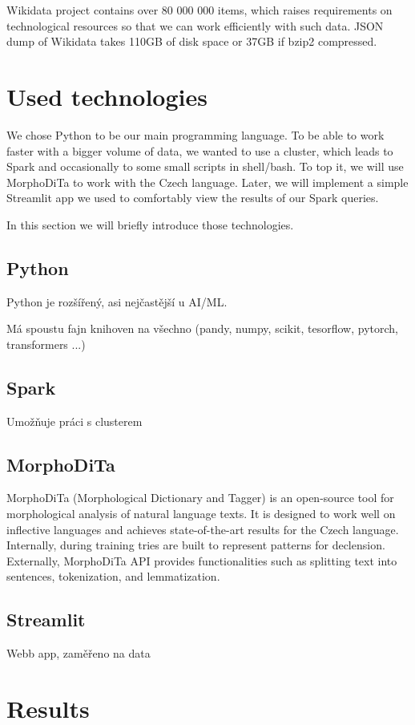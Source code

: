 Wikidata project contains over 80 000 000 items, which raises  requirements on technological resources so that we can work efficiently with such data. JSON dump of Wikidata takes 110GB of disk space or 37GB if bzip2 compressed.



\section{Used technologies}
We chose Python to be our main programming language. To be able to work faster with a bigger volume of data, we wanted to use a cluster, which leads to Spark and occasionally to some small scripts in shell/bash. To top it, we will use MorphoDiTa to work with the Czech language. Later, we will implement a simple Streamlit app we used to comfortably view the results of our Spark queries.

In this section we will briefly introduce those technologies.
\subsection{Python}
Python je rozšířený, asi nejčastější u AI/ML.

Má spoustu fajn knihoven na všechno (pandy, numpy, scikit, tesorflow, pytorch, transformers ...)

\subsection{Spark}
Umožňuje práci s clusterem

\subsection{MorphoDiTa}
MorphoDiTa \cite{Morphodita} (Morphological Dictionary and Tagger) is an open-source tool for morphological analysis of natural language texts. It is designed to work well on inflective languages and achieves state-of-the-art results for the Czech language. Internally, during training tries are built to represent patterns for declension. Externally, MorphoDiTa API provides functionalities such as splitting text into sentences, tokenization, and lemmatization.

\subsection{Streamlit}
Webb app, zaměřeno na data




\section{Results}


